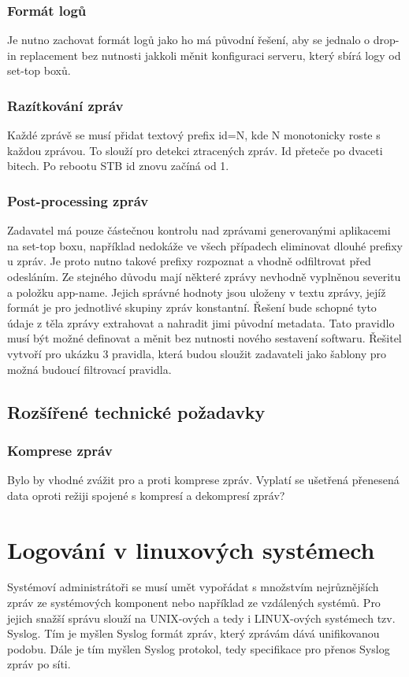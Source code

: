 \documentclass[thesis=B,czech]{FITthesis}[2012/06/26]
\begin{document}
\subsection{Formát logů}
Je nutno zachovat formát logů jako ho má původní řešení, aby se jednalo o drop-in replacement bez nutnosti jakkoli měnit konfiguraci serveru, který sbírá logy od set-top boxů.

\subsection{Razítkování zpráv}
Každé zprávě se musí přidat textový prefix id=N, kde N monotonicky roste s každou zprávou.  To slouží pro detekci ztracených zpráv. Id přeteče po dvaceti bitech. Po rebootu STB id znovu začíná od 1.

\subsection{Post-processing zpráv}
Zadavatel má pouze částečnou kontrolu nad zprávami generovanými aplikacemi na set-top boxu, například nedokáže ve všech případech eliminovat dlouhé prefixy u zpráv. Je proto nutno takové prefixy rozpoznat a vhodně odfiltrovat před odesláním. Ze stejného důvodu mají některé zprávy nevhodně vyplněnou severitu a položku app-name. Jejich správné hodnoty jsou uloženy v textu zprávy, jejíž formát je pro jednotlivé skupiny zpráv konstantní. Řešení bude schopné tyto údaje z těla zprávy extrahovat a nahradit jimi původní metadata. Tato pravidlo musí být možné definovat a měnit bez nutnosti nového sestavení softwaru. 
Řešitel vytvoří pro ukázku 3 pravidla, která budou sloužit zadavateli jako šablony pro možná budoucí filtrovací pravidla.

\section{Rozšířené technické požadavky}

\subsection{Komprese zpráv}
Bylo by vhodné zvážit pro a proti komprese zpráv. Vyplatí se ušetřená přenesená data oproti režiji spojené s kompresí a dekompresí zpráv?

\chapter{Logování v linuxových systémech}
Systémoví administrátoři se musí umět vypořádat s množstvím nejrůznějších zpráv ze systémových komponent nebo například ze vzdálených systémů.
Pro jejich snažší správu slouží na UNIX-ových a tedy i LINUX-ových systémech tzv. Syslog.
Tím je myšlen Syslog formát zpráv, který zprávám dává unifikovanou podobu.
Dále je tím myšlen Syslog protokol, tedy specifikace pro přenos Syslog zpráv po síti.
\end{document}
